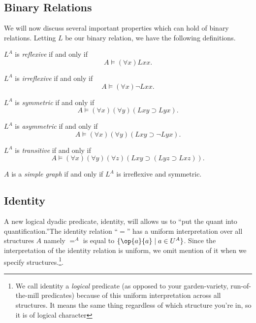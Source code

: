 \subsection{Binary Relations}
We will now discuss several important properties which can hold of binary relations. Letting $L$ be our binary relation, we have the following definitions. 

\begin{definition}
$L^A$ is \emph{reflexive} if and only if
\[A\models (\forall x)Lxx.\]
\end{definition}

\begin{definition}
$L^A$ is \emph{irreflexive} if and only if
\[A\models (\forall x)\neg Lxx.\]
\end{definition}

\begin{definition}
$L^A$ is \emph{symmetric} if and only if
\[A\models (\forall x)(\forall y)(Lxy\supset Lyx).\]
\end{definition}

\begin{definition}
$L^A$ is \emph{asymmetric} if and only if
\[A\models (\forall x)(\forall y)(Lxy\supset \neg Lyx).\]
\end{definition}

\begin{definition}
$L^A$ is \emph{transitive} if and only if
\[A\models (\forall x)(\forall y)(\forall z)(Lxy\supset (Lyz\supset Lxz)).\]
\end{definition}

\begin{definition}
$A$ is a \emph{simple graph} if and only if $L^A$ is irreflexive and symmetric.
\end{definition}

\subsection*{Identity}
A new logical dyadic predicate, identity, will  allows us to ``put the quant into quantification.''The identity relation ``$=$'' has a uniform interpretation over all structures $A$ namely $=^A$ is equal to $\{\op{a}{a}\mid a\in U^A\}$. Since the interpretation of the identity relation is uniform, we omit mention of it when we specify structures.\footnote{We call identity a \emph{logical} predicate (as opposed to your garden-variety, run-of-the-mill predicates) because of this uniform interpretation across all structures. It means the same thing regardless of which structure you're in, so it is of logical character}. 

